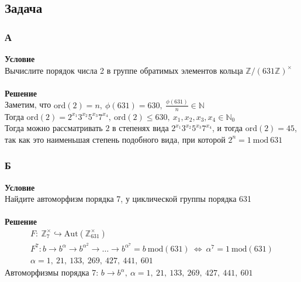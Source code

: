 		
		
		\subsection*{Задача}
			\subsubsection*{А}
			\textbf{Условие}\\
			Вычислите порядок числа 2 в группе обратимых элементов кольца $\mathbb{Z} \slash (631 \mathbb{Z})^{\times}$\\
			\\
			\textbf{Решение}\\
			Заметим, что $\text{ord}(2) = n,\ \phi(631) = 630,\ \frac{\phi(631)}{n} \in \mathbb{N}$\\
			Тогда $\text{ord}(2) = 2^{x_1} 3^{x_2} 5^{x_3} 7^{x_4},\ \text{ord}(2) \leqslant 630,\ x_1, x_2, x_3, x_4 \in \mathbb{N}_0$\\
			Тогда можно рассматривать $2$ в степенях вида $2^{x_1} 3^{x_2} 5^{x_3} 7^{x_4}$, и тогда $\text{ord}(2) = 45$, так как это наименьшая степень подобного вида, при которой $2^n = 1\ \text{mod}\: 631$
			
			
			\subsubsection*{Б}
			\textbf{Условие}\\
			Найдите автоморфизм порядка 7, у циклической группы порядка 631\\
			\\
			\textbf{Решение}\\
			\begin{gather*}
				F:\ \mathbb{Z}^{\times}_7 \hookrightarrow \text{Aut}(\mathbb{Z}^{\times}_{631})\\
				F^7: b \to b^{\alpha} \to b^{\alpha^2} \to \ldots \to b^{\alpha^7} = b\ \text{mod}(631)\ \Leftrightarrow\ \alpha^7 = 1\ \text{mod}(631)\\
				\alpha = 1,\: 21,\: 133,\: 269,\: 427,\: 441,\: 601
			\end{gather*}
			Автоморфизмы порядка 7: $b \to b^{\alpha},\ \alpha = 1,\: 21,\: 133,\: 269,\: 427,\: 441,\: 601$
			
			

